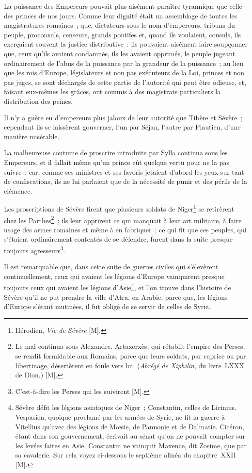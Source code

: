 \documentclass[french,twoside]{book} %
\begin{document}
La puissance des Empereurs pouvait plus aisément paraître tyrannique que celle des princes de nos jours. Comme leur dignité était un assemblage de toutes les magistratures romaines ; que, dictateurs sous le nom d’empereurs, tribuns du peuple, proconsuls, censeurs, grands pontifes et, quand ils voulaient, consuls, ils exerçaient souvent la justice distributive : ils pouvaient aisément faire soupçonner que, ceux qu’ils avaient condamnés, ils les avaient opprimés, le peuple jugeant ordinairement de l’abus de la puissance par la grandeur de la puissance ; au lieu que les rois d’Europe, législateurs et non pas exécuteurs de la Loi, princes et non pas juges, se sont déchargés de cette partie de l’autorité qui peut être odieuse, et, faisant eux-mêmes les grâces, ont commis à des magistrats particuliers la distribution des peines.\par
Il n’y a guère eu d’empereurs plus jaloux de leur autorité que Tibère et Sévère ; cependant ils se laissèrent gouverner, l’un par Séjan, l’autre par Plautien, d’une manière misérable.\par
La malheureuse coutume de proscrire introduite par Sylla continua sous les Empereurs, et il fallait même qu’un prince eût quelque vertu pour ne la pas suivre ; car, comme ses ministres et ses favoris jetaient d’abord les yeux sur tant de confiscations, ils ne lui parlaient que de la nécessité de punir et des périls de la clémence.\par
Les proscriptions de Sévère firent que plusieurs soldats de Niger\footnote{Hérodien, {\itshape Vie de Sévère} [M].} se retirèrent chez les Parthes\footnote{Le mal continua sous Alexandre. Artaxerxès, qui rétablit l’empire des Perses, se rendit formidable aux Romains, parce que leurs soldats, par caprice ou par libertinage, désertèrent en foule vers lui. ({\itshape Abrégé de Xiphilin}, du livre LXXX de Dion.) [M].} ; ils leur apprirent ce qui manquait à leur art militaire, à faire usage des armes romaines et même à en fabriquer ; ce qui fit que ces peuples, qui s’étaient ordinairement contentés de se défendre, furent dans la suite presque toujours agresseurs\footnote{C’est-à-dire les Perses qui les suivirent [M].}.\par
Il est remarquable que, dans cette suite de guerres civiles qui s’élevèrent continuellement, ceux qui avaient les légions d’Europe vainquirent presque toujours ceux qui avaient les légions d’Asie\footnote{Sévère défit les légions asiatiques de Niger ; Constantin, celles de Licinius. Vespasien, quoique proclamé par les armées de Syrie, ne fit la guerre à Vitellius qu’avec des légions de Mœsie, de Pannonie et de Dalmatie. Cicéron, étant dans son gouvernement, écrivait au sénat qu’on ne pouvait compter sur les levées faites en Asie. Constantin ne vainquit Maxence, dit Zosime, que par sa cavalerie. Sur cela voyez ci-dessous le septième alinéa du chapitre XXII [M].}, et l’on trouve dans l’histoire de Sévère qu’il ne put prendre la ville d’Atra, en Arabie, parce que, les légions d’Europe s’étant mutinées, il fut obligé de se servir de celles de Syrie.\par
\end{document}
